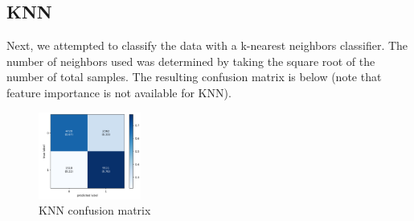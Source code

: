 \documentclass[12pt]{article}
\begin{document}
\subsection{KNN}
Next, we attempted to classify the data with a k-nearest neighbors classifier. The number of neighbors used was determined by taking the square root of the number of total samples. The resulting confusion matrix is below (note that feature importance is not available for KNN).
\begin{figure}[H]
  \centering
  \includegraphics[width=0.3\textwidth]{knn_cm.png}
  \caption{KNN confusion matrix}
  \label{fig:knn}
\end{figure}
\end{document}
